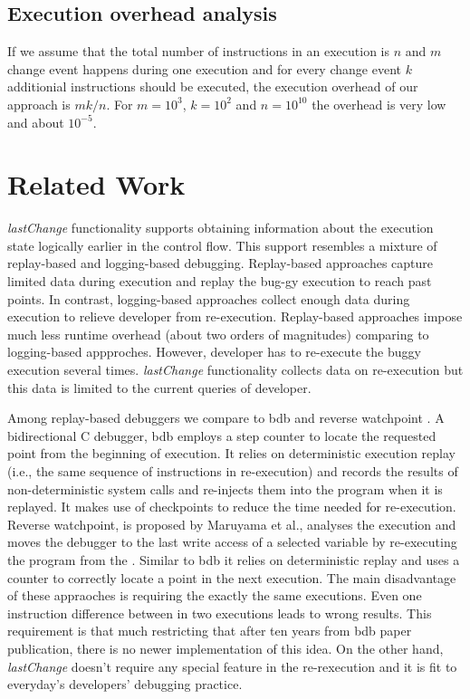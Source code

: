 \documentclass[preprint]{sigplanconf}
\begin{document}
\subsection{Execution overhead analysis}
If we assume that the total number of instructions in an execution is
$n$ and $m$ change event happens during one execution and for every
change event $k$ additionial instructions should be executed, the
execution overhead of our approach is $mk/n$. For $m=10^3$, $k=10^2$
and $n=10^{10}$ the overhead is very low and about $10^{-5}$.

\section{Related Work}

\textit{lastChange} functionality supports obtaining information about
the execution state logically earlier in the control flow. This
support resembles a mixture of replay-based and logging-based
debugging. Replay-based approaches capture limited data during
execution and replay the bug-gy execution to reach past points. In
contrast, logging-based approaches collect enough data during
execution to relieve developer from re-execution. Replay-based
approaches impose much less runtime overhead (about two orders of
magnitudes) comparing to logging-based appproches. However, developer
has to re-execute the buggy execution several
times. \textit{lastChange} functionality collects data on re-execution
but this data is limited to the current queries of developer.

Among replay-based debuggers we compare to bdb \cite{Boothe} and
reverse watchpoint \cite{Maruyama}.  A bidirectional C debugger, bdb
employs a step counter to locate the requested point from the
beginning of execution. It relies on deterministic execution replay
(i.e., the same sequence of instructions in re-execution) and records
the results of non-deterministic system calls and re-injects them into
the program when it is replayed. It makes use of checkpoints to reduce
the time needed for re-execution.  Reverse watchpoint, is proposed by
Maruyama et al., analyses the execution and moves the debugger to the
last write access of a selected variable by re-executing the program
from the \cite{Maruyama}.  Similar to bdb it relies on deterministic
replay and uses a counter to correctly locate a point in the next
execution. The main disadvantage of these appraoches is requiring the
exactly the same executions. Even one instruction difference between
in two executions leads to wrong results. This requirement is that
much restricting that after ten years from bdb paper publication,
there is no newer implementation of this idea. On the other hand,
\textit{lastChange} doesn't require any special feature in the
re-rexecution and it is fit to everyday's developers' debugging
practice.
\end{document}
